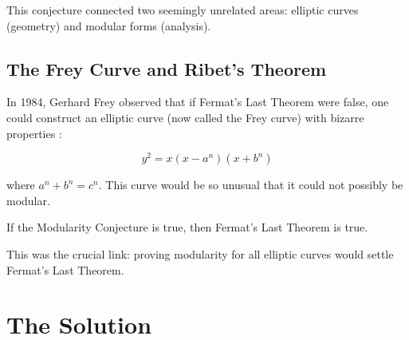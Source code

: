 This conjecture connected two seemingly unrelated areas: elliptic curves (geometry) and modular forms (analysis).

\subsection{The Frey Curve and Ribet's Theorem}

In 1984, Gerhard Frey observed that if Fermat's Last Theorem were false, one could construct an elliptic curve (now called the Frey curve) with bizarre properties \cite{frey1984}:

\begin{equation}
y^2 = x(x - a^n)(x + b^n)
\end{equation}

where $a^n + b^n = c^n$. This curve would be so unusual that it could not possibly be modular.

\begin{theorem}
If the Modularity Conjecture is true, then Fermat's Last Theorem is true.
\end{theorem}

This was the crucial link: proving modularity for all elliptic curves would settle Fermat's Last Theorem.

\section{The Solution}

